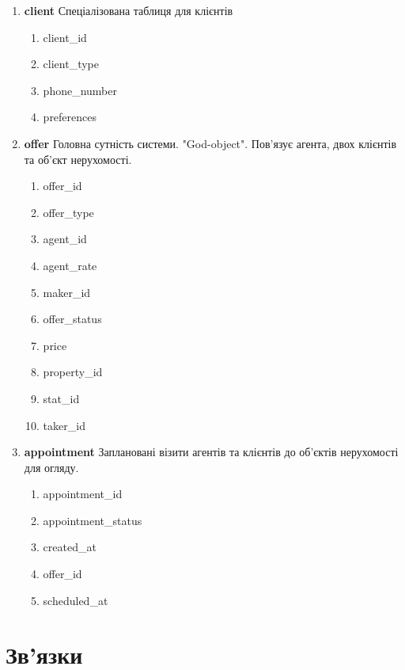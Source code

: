 \begin{enumerate}
    \item \textbf{client}
          Спеціалізована таблиця для клієнтів
          \begin{enumerate}
              \item client\_id
              \item client\_type
              \item phone\_number
              \item preferences
          \end{enumerate}

    \item \textbf{offer}
          Головна сутність системи. "God-object". Пов'язує агента, двох клієнтів та об'єкт нерухомості.
          \begin{enumerate}
              \item offer\_id
              \item offer\_type
              \item agent\_id
              \item agent\_rate
              \item maker\_id
              \item offer\_status
              \item price
              \item property\_id
              \item stat\_id
              \item taker\_id
          \end{enumerate}

    \item \textbf{appointment}
          Заплановані візити агентів та клієнтів до об'єктів нерухомості для огляду.
          \begin{enumerate}
              \item appointment\_id
              \item appointment\_status
              \item created\_at
              \item offer\_id
              \item scheduled\_at
          \end{enumerate}
\end{enumerate}

\section{Зв'язки}

